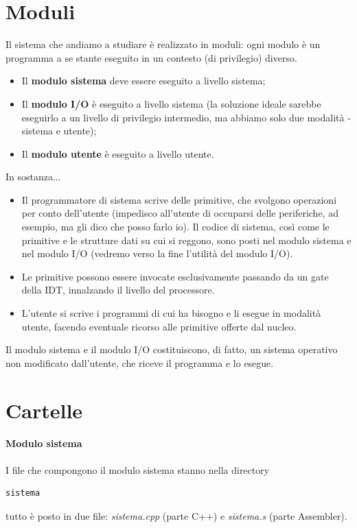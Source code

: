 \section{Moduli} Il sistema che andiamo a studiare è realizzato in moduli: ogni modulo è un programma a se stante eseguito in un contesto (di privilegio) diverso. 
\begin{itemize}
	\item Il \textbf{modulo sistema} deve essere eseguito a livello sistema;
	\item Il \textbf{modulo I/O} è eseguito a livello sistema (la soluzione ideale sarebbe eseguirlo a un livello di privilegio intermedio, ma abbiamo solo due modalità - sistema e utente);
	\item Il \textbf{modulo utente} è eseguito a livello utente. 
\end{itemize}
In sostanza...
\begin{itemize}
	\item Il programmatore di sistema scrive delle primitive, che svolgono operazioni per conto dell'utente (impedisco all'utente di occuparsi delle periferiche, ad esempio, ma gli dico che posso farlo io). Il codice di sistema, così come le primitive e le strutture dati su cui si reggono, sono posti nel modulo sistema e nel modulo I/O (vedremo verso la fine l'utilità del modulo I/O). 
	\item Le primitive possono essere invocate esclusivamente passando da un gate della IDT, innalzando il livello del processore.  
	\item L'utente si scrive i programmi di cui ha bisogno e li esegue in modalità utente, facendo eventuale ricorso alle primitive offerte dal nucleo. 
\end{itemize} Il modulo sistema e il modulo I/O costituiscono, di fatto, un sistema operativo non modificato dall'utente, che riceve il programma e lo esegue.

\section{Cartelle}
\paragraph{Modulo sistema} I file che compongono il modulo sistema stanno nella directory 
\begin{verbatim}sistema\end{verbatim}
tutto è posto in due file: \emph{sistema.cpp} (parte C++) e \emph{sistema.s} (parte Assembler). 

